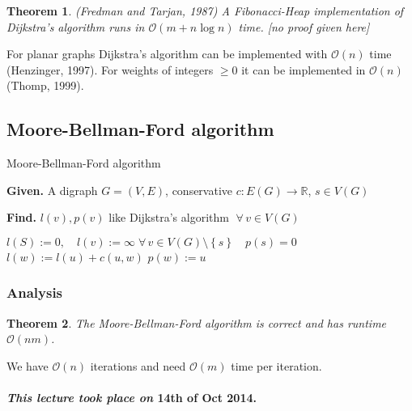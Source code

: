 \documentclass{article}
\newtheorem{theorem}{Theorem}
\newcommand{\set}[1]{\left\{#1\right\}}
\newcommand{\given}[1]{\textbf{Given.} #1\par}
\newcommand{\find}[1]{\textbf{Find.} #1\par}
\newcommand{\dateref}[1]{\paragraph{\textit{This lecture took place on} #1.}}
\newcommand{\fall}{\;\forall\,}
\begin{document}
\begin{theorem}\label{satz-3.3}
  (Fredman and Tarjan, 1987)
  A Fibonacci-Heap implementation of Dijkstra's algorithm runs in $\mathcal{O}(m + n\log{n})$ time. [no proof given here]
\end{theorem}

For planar graphs Dijkstra's algorithm can be implemented with $\mathcal{O}(n)$ time (Henzinger, 1997). For weights of integers $\geq 0$ it can be implemented in $\mathcal{O}(n)$ (Thomp, 1999).

\subsection{Moore-Bellman-Ford algorithm}
%
\begin{algorithm}
  \caption{Moore-Bellman-Ford algorithm}
  \label{mbf-algo}
  \given{A digraph $G=(V, E)$, conservative $c: E(G) \rightarrow \mathbb{R}$, $s \in V(G)$}
  \find{$l(v), p(v)$ like Dijkstra's algorithm $\fall v \in V(G)$}
\begin{algorithmic}[1]
  \State $l(S) := 0, \quad l(v) := \infty \fall v \in V(G) \setminus \set{s} \quad p(s) = 0$
        \State $l(w) := l(u) + c(u,w)$
        \State $p(w) := u$
      \EndIf
    \EndFor
  \EndFor
\end{algorithmic}
\end{algorithm}

\subsubsection{Analysis}

\begin{theorem}\label{satz-3.4}
  The Moore-Bellman-Ford algorithm is correct and has runtime $\mathcal{O}(nm)$.
\end{theorem}

We have $\mathcal{O}(n)$ iterations and need $\mathcal{O}(m)$ time per iteration.

\dateref{14th of Oct 2014}
\end{document}
